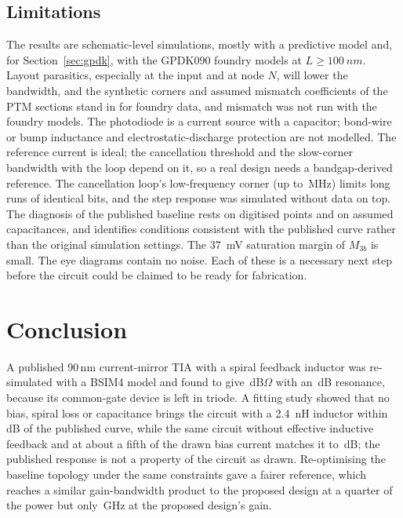 \documentclass[11pt,a4paper]{article}
\begin{document}
\subsection{Limitations}
The results are schematic-level simulations, mostly with a predictive model and, for Section~\ref{sec:gpdk}, with the GPDK090 foundry models at $L\geq\SI{100}{nm}$. Layout parasitics, especially at the input and at node $N$, will lower the bandwidth, and the synthetic corners and assumed mismatch coefficients of the PTM sections stand in for foundry data, and mismatch was not run with the foundry models. The photodiode is a current source with a capacitor; bond-wire or bump inductance and electrostatic-discharge protection are not modelled. The reference current is ideal; the cancellation threshold and the slow-corner bandwidth with the loop depend on it, so a real design needs a bandgap-derived reference. The cancellation loop's low-frequency corner (up to \DcFloMax\,MHz) limits long runs of identical bits, and the step response was simulated without data on top. The diagnosis of the published baseline rests on digitised points and on assumed capacitances, and identifies conditions consistent with the published curve rather than the original simulation settings. The \SI{37}{mV} saturation margin of $M_{3b}$ is small. The eye diagrams contain no noise. Each of these is a necessary next step before the circuit could be claimed to be ready for fabrication.

\section{Conclusion}
A published 90\,nm current-mirror TIA with a spiral feedback inductor was re-simulated with a BSIM4 model and found to give \BZt\,dB$\Omega$ with an \BPk\,dB resonance, because its common-gate device is left in triode. A fitting study showed that no bias, spiral loss or capacitance brings the circuit with a \SI{2.4}{nH} inductor within \DgRmsBestL\,dB of the published curve, while the same circuit without effective inductive feedback and at about a fifth of the drawn bias current matches it to \DgRmsNoL\,dB; the published response is not a property of the circuit as drawn. Re-optimising the baseline topology under the same constraints gave a fairer reference, which reaches a similar gain-bandwidth product to the proposed design at a quarter of the power but only \RgBw\,GHz at the proposed design's gain.
\end{document}
